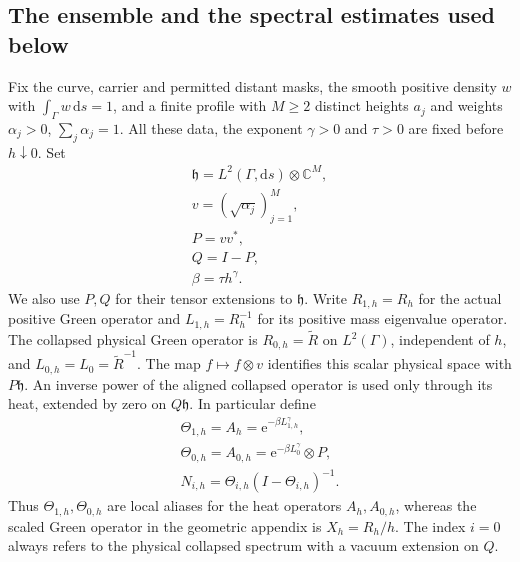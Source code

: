 \documentclass[aps,pra,reprint,superscriptaddress,longbibliography]{revtex4-2}
\newcommand{\dd}{\mathrm d}
\newcommand{\ee}{\mathrm e}
\begin{document}
\subsection{The ensemble and the spectral estimates used below}
\label{sgt:bose:model}

Fix the curve, carrier and permitted distant masks, the smooth positive
density $w$ with $\int_\Gamma w\,\dd s=1$, and a finite profile with $M\ge2$
distinct heights $a_j$ and weights $\alpha_j>0$, $\sum_j\alpha_j=1$.
All these data, the exponent $\gamma>0$ and $\tau>0$ are fixed before
$h\downarrow0$.  Set
\begin{equation}
\begin{gathered}
 \mathfrak h=L^2(\Gamma,\dd s)\otimes\mathbb C^M,
 \\
 v=(\sqrt{\alpha_j})_{j=1}^M,\\
 P=vv^*,\\
 Q=I-P,\\
 \beta=\tau h^\gamma.
 \label{sgt:bose:parameters}
\end{gathered}
\end{equation}
We also use $P,Q$ for their tensor extensions to $\mathfrak h$.
Write $R_{1,h}=R_h$ for the actual positive Green operator and
$L_{1,h}=R_h^{-1}$ for its positive mass eigenvalue operator.  The
collapsed physical Green operator is $R_{0,h}=\widetilde R$ on
$L^2(\Gamma)$, independent of $h$, and
$L_{0,h}=L_0=\widetilde R^{-1}$.  The map $f\mapsto f\otimes v$
identifies this scalar physical space with $P\mathfrak h$.  An inverse power of the aligned collapsed operator
is used only through its heat, extended by zero on $Q\mathfrak h$.
In particular define
\begin{equation}
\begin{gathered}
 \Theta_{1,h}=A_h=\ee^{-\beta L_{1,h}^{\gamma}},\\
 \Theta_{0,h}=A_{0,h}=\ee^{-\beta L_0^{\gamma}}\otimes P,
 \\
 N_{i,h}=\Theta_{i,h}(I-\Theta_{i,h})^{-1}.
 \label{sgt:bose:heat-covariance}
\end{gathered}
\end{equation}
Thus $\Theta_{1,h},\Theta_{0,h}$ are local aliases for the heat
operators $A_h,A_{0,h}$, whereas the scaled Green operator in the
geometric appendix is $X_h=R_h/h$.  The index $i=0$ always refers to the
physical collapsed spectrum with a vacuum extension on $Q$.
\end{document}
